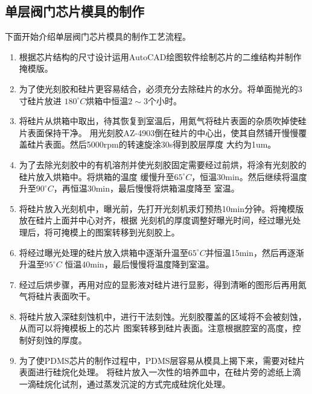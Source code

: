 \subsection{单层阀门芯片模具的制作}
	下面开始介绍单层阀门芯片模具的制作工艺流程。
	\begin{enumerate}[label={\alph*)},font={\color{black!50!black}\bfseries}]
	\item 根据芯片结构的尺寸设计运用AutoCAD绘图软件绘制芯片的二维结构并制作掩模版。
	\item 为了使光刻胶和硅片更容易结合，必须充分去除硅片的水分。将单面抛光的3寸硅片放进
	$180^\circ C$烘箱中恒温$2\sim3$个小时。
	\item 将硅片从烘箱中取出，待其恢复到室温后，用氮气将硅片表面的杂质吹掉使硅片表面保持干净。
	用光刻胶AZ-4903倒在硅片的中心出，使其自然铺开慢慢覆盖硅片表面。然后5000rpm的转速旋涂30s得到胶层厚度
	大约为1um。
	\item 为了去除光刻胶中的有机溶剂并使光刻胶固定需要经过前烘，将涂有光刻胶的硅片放入烘箱中。将烘箱的温度
	缓慢升至$65^\circ C$，恒温30min。然后继续将温度升至$90^\circ C$，再恒温30min，最后慢慢将烘箱温度降至
	室温。
	\item 将硅片放入光刻机中，曝光前，先打开光刻机汞灯预热10min分钟。将掩模版放在硅片上面并中心对齐，根据
	光刻机的厚度调整好曝光时间，经过曝光处理后，将可掩模上的图案转移到光刻胶上。
	\item 将经过曝光处理的硅片放入烘箱中逐渐升温至$65^\circ C$并恒温15min，然后再逐渐升温至$95^\circ C$
	恒温40min，最后慢慢将温度降到室温。
	\item 经过后烘步骤，再用对应的显影液对硅片进行显影，得到清晰的图形后再用氮气将硅片表面吹干。
	\item 将硅片放入深硅刻蚀机中，进行干法刻蚀。光刻胶覆盖的区域将不会被刻蚀，从而可以将掩模板上的芯片
	图案转移到硅片表面。注意根据腔室的高度，控制好刻蚀的厚度。
	\item 为了使PDMS芯片的制作过程中，PDMS层容易从模具上揭下来，需要对硅片表面进行硅烷化处理。
	将硅片放入一次性的培养皿中，在硅片旁的滤纸上滴一滴硅烷化试剂，通过蒸发沉淀的方式完成硅烷化处理。
	\end{enumerate}
